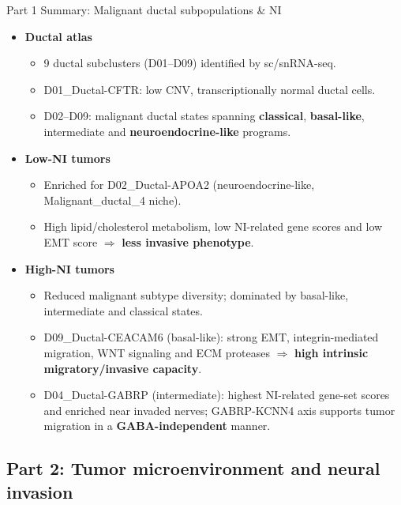 \documentclass[10pt]{beamer}
\theoremstyle{plain}
\begin{document}
\begin{frame}{Part 1 Summary: Malignant ductal subpopulations \& NI}
  \begin{itemize}
    \item \textbf{Ductal atlas}
      \begin{itemize}
        \item 9 ductal subclusters (D01--D09) identified by sc/snRNA-seq.
        \item D01\_Ductal-CFTR: low CNV, transcriptionally normal ductal cells.
        \item D02--D09: malignant ductal states spanning \textbf{classical}, \textbf{basal-like}, intermediate and \textbf{neuroendocrine-like} programs.
      \end{itemize}
    \item \textbf{Low-NI tumors}
      \begin{itemize}
        \item Enriched for D02\_Ductal-APOA2 (neuroendocrine-like, Malignant\_ductal\_4 niche).
        \item High lipid/cholesterol metabolism, low NI-related gene scores and low EMT score
              \(\Rightarrow\) \textbf{less invasive phenotype}.
      \end{itemize}
    \item \textbf{High-NI tumors}
      \begin{itemize}
        \item Reduced malignant subtype diversity; dominated by basal-like, intermediate and classical states.
        \item D09\_Ductal-CEACAM6 (basal-like): strong EMT, integrin-mediated migration, WNT signaling and ECM proteases
              \(\Rightarrow\) \textbf{high intrinsic migratory/invasive capacity}.
        \item D04\_Ductal-GABRP (intermediate): highest NI-related gene-set scores and enriched near invaded nerves;
              GABRP-KCNN4 axis supports tumor migration in a \textbf{GABA-independent} manner.
      \end{itemize}
  \end{itemize}
\end{frame}

\subsection{Part 2: Tumor microenvironment and neural invasion}
\end{document}
